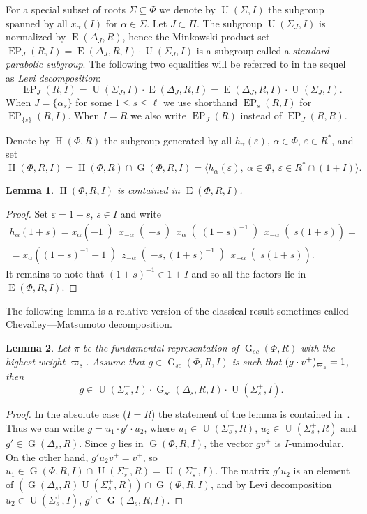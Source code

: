 \documentclass[12pt]{amsart}
\theoremstyle{plain} \declaretheorem[name=Theorem, Refname={Theorem,Theorems}]{thm} \Crefname{thm}{Theorem}{Theorems}
\numberwithin{equation}{section}
\newtheorem{lemma}{Lemma} \numberwithin{lemma}{section} \Crefname{lemma}{Lemma}{Lemmas}
\theoremstyle{definition} \newtheorem{dfn}[lemma]{Definition} \Crefname{dfn}{Definition}{Definitions}
\theoremstyle{remark} \newtheorem{rem}[lemma]{Remark} \Crefname{rem}{Remark}{Remarks}
\DeclareMathOperator{\G}{G}
\DeclareMathOperator{\E}{E}
\DeclareMathOperator{\EP}{EP}
\DeclareMathOperator{\Hh}{H}
\DeclareMathOperator{\U}{U}
\def\ssub#1{\mathchoice
   {_{\lower2pt\hbox{$\scriptstyle #1$}}}
   {_{\lower2pt\hbox{$\scriptstyle #1$}}}
   {_{\lower1.5pt\hbox{$\scriptscriptstyle #1$}}}
   {_{\!\lower1.5pt\hbox{$\scriptscriptstyle #1$}}}}
\begin{document}
For a special subset of roots $\Sigma\subseteq \Phi$ we denote by $\U(\Sigma, I)$ the subgroup spanned by all $x_{\alpha}(I)$ for $\alpha\in \Sigma$. Let $J\subset\Pi$.
The subgroup $\U(\Sigma_J, I)$ is normalized by $\E(\Delta_J, R)$, hence the Minkowski product set $\EP_J(R, I) = \E(\Delta_J, R, I) \cdot \U(\Sigma_J, I)$ is a subgroup called a \emph{standard parabolic subgroup}.
The following two equalities will be referred to in the sequel as {\it Levi decomposition}: 
\begin{equation} \label{rel:Levi-decomp} \EP_J(R, I) = \U(\Sigma_J, I) \cdot \E(\Delta_J, R, I) = \E(\Delta_J, R, I) \cdot \U(\Sigma_J, I). \end{equation}
When $J = \{ \alpha_s \}$ for some $1 \leq s\leq \ell$ we use shorthand $\EP_s(R, I)$ for $\EP_{\{s\}}(R, I)$.
When $I=R$ we also write $\EP_J(R)$ instead of $\EP_J(R, R)$.

Denote by $\Hh(\Phi,R)$ the subgroup generated by all $h_\alpha(\varepsilon)$, $\alpha\in\Phi$, $\varepsilon\in R^*$, and set
\[ \Hh(\Phi,R,I) = \Hh(\Phi,R)\cap\G(\Phi,R,I)=\langle h_\alpha(\varepsilon),\ \alpha\in\Phi,\ \varepsilon\in R^*\cap(1+I)\rangle. \]
\begin{lemma}\label{lemma:rel-tor-elementary}
$\Hh(\Phi,R,I)$ is contained in $\E(\Phi,R,I)$.
\end{lemma}
\begin{proof}
Set $\varepsilon=1+s$, $s\in I$ and write
\begin{multline*}
h_\alpha(1+s) = x_\alpha\left(-1\middle)\, x_{-\alpha}\middle(-s\middle)\, x_\alpha\middle((1+s)^{-1}\middle)\, x_{-\alpha}\middle(s(1+s)\right) = \\
= x_\alpha\left((1+s)^{-1}-1\middle)\, z_{-\alpha}\middle(-s,(1+s)^{-1}\middle)\, x_{-\alpha}\middle(s(1+s)\right).
\end{multline*}
It remains to note that $(1+s)^{-1}\in 1+I$ and so all the factors lie in $\E(\Phi,R,I)$.
\end{proof}

The following lemma is a relative version of the classical result sometimes called Chevalley---Matsumoto decomposition.
\begin{lemma}\label{lemma:Chevalley-Matsumoto}
Let $\pi$ be the fundamental representation of $\G_{sc}(\Phi, R)$ with the highest weight $\varpi_s$.
Assume that $g\in \G_{sc}(\Phi, R, I)$ is such that $(g\cdot v^+)_{\varpi\ssub{s}}=1$, then 
\[ g \in \U(\Sigma_s^-, I) \cdot \G_{sc}(\Delta_s, R, I) \cdot \U(\Sigma_s^+, I). \]
\end{lemma}
\begin{proof}
In the absolute case ($I=R$) the statement of the lemma is contained in~\cite[Theorem~1.3]{St78}. 
Thus we can write $g=u_1\cdot g'\cdot u_2$, where $u_1\in\U(\Sigma_s^-,R)$, $u_2\in\U(\Sigma_s^+,R)$ and $g'\in\G(\Delta_s,R)$.
Since $g$ lies in $\G(\Phi,R,I)$, the vector $gv^+$ is $I$-unimodular. 
On the other hand, $g'u_2v^+=v^+$, so $u_1\in\G(\Phi,R,I)\cap\U(\Sigma_s^-,R)=\U(\Sigma_s^-,I)$.
The matrix $g'u_2$ is an element of $\left(\G(\Delta_s,R)\U(\Sigma_s^+,R)\right)\cap\G(\Phi,R,I)$, and by Levi decomposition $u_2\in\U(\Sigma_s^+,I)$, $g'\in\G(\Delta_s,R,I)$.
\end{proof}
\end{document}
